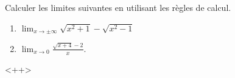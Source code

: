 

\begin{exercice}\label{exoINGE11140030}

	Calculer les limites suivantes en utilisant les règles de calcul.
	\begin{enumerate}

		\item
			$\lim_{x\to \pm\infty} \sqrt{x^2+1}-\sqrt{x^2-1}$

		\item
			$\lim_{x\to 0} \frac{ \sqrt{x+4}-2 }{ x }$.

	\end{enumerate}
	<++>

\end{exercice}
